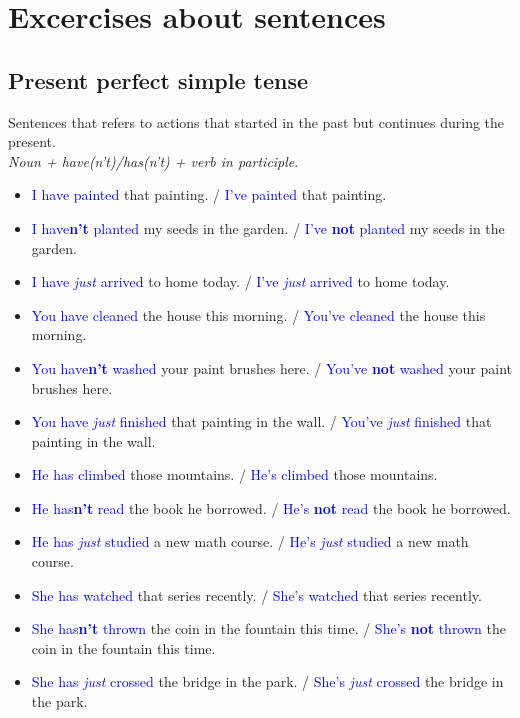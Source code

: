 \section{Excercises about sentences}
\subsection{Present perfect simple tense}
\begin{multicols}{2}
Sentences that refers to actions that started in the past but continues during the present.\\
\emph{Noun + have(n't)/has(n't) + verb in participle}.\\

\begin{itemize}
\item \textcolor{blue}{I have painted} that painting. / \textcolor{blue}{I've painted} that painting.
\item \textcolor{blue}{I have\textbf{n't} planted} my seeds in the garden. / \textcolor{blue}{I've \textbf{not} planted} my seeds in the garden.
\item \textcolor{blue}{I have \emph{just} arrived} to home today. / \textcolor{blue}{I've \emph{just} arrived} to home today.

\item \textcolor{blue}{You have cleaned} the house this morning. / \textcolor{blue}{You've cleaned} the house this morning.
\item \textcolor{blue}{You have\textbf{n't} washed} your paint brushes here. / \textcolor{blue}{You've \textbf{not} washed} your paint brushes here.
\item \textcolor{blue}{You have \emph{just} finished} that painting in the wall. / \textcolor{blue}{You've \emph{just} finished} that painting in the wall.

\item \textcolor{blue}{He has climbed} those mountains. / \textcolor{blue}{He's climbed} those mountains.
\item \textcolor{blue}{He has\textbf{n't} read} the book he borrowed. / \textcolor{blue}{He's \textbf{not} read} the book he borrowed.
\item \textcolor{blue}{He has \emph{just} studied} a new math course. / \textcolor{blue}{He's \emph{just} studied} a new math course.

\item \textcolor{blue}{She has watched} that series recently. / \textcolor{blue}{She's watched} that series recently.
\item \textcolor{blue}{She has\textbf{n't} thrown} the coin in the fountain this time. / \textcolor{blue}{She's \textbf{not} thrown} the coin in the fountain this time.
\item \textcolor{blue}{She has \emph{just} crossed} the bridge in the park. / \textcolor{blue}{She's \emph{just} crossed} the bridge in the park.


\end{itemize}
\end{multicols}
